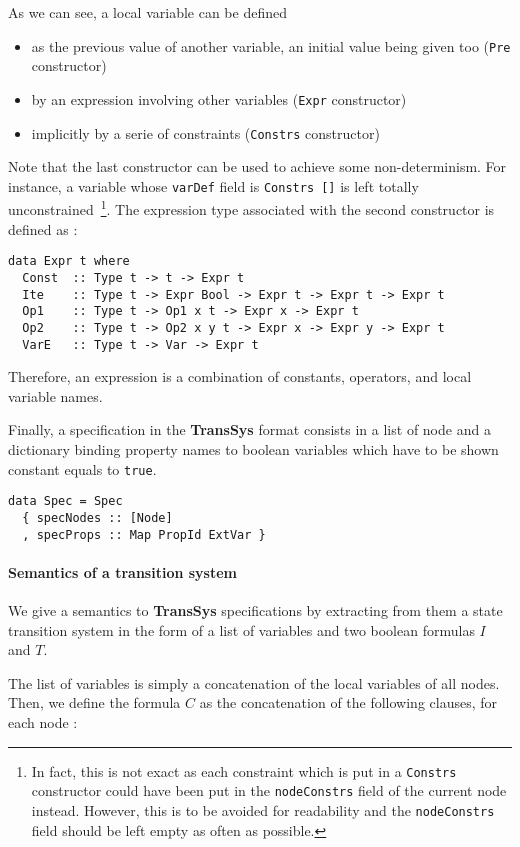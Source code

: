 As we can see, a local variable can be defined
\begin{itemize}
\item as the previous value of another variable, an initial value being given too (\texttt{Pre} constructor)
\item by an expression involving other variables (\texttt{Expr} constructor)
\item implicitly by a serie of constraints (\texttt{Constrs} constructor)
\end{itemize}
Note that the last constructor can be used to achieve some non-determinism. For instance, a variable whose \texttt{varDef} field is \texttt{Constrs []} is left totally unconstrained~\footnote{In fact, this is not exact as each constraint which is put in a \texttt{Constrs} constructor could have been put in the \texttt{nodeConstrs} field of the current node instead. However, this is to be avoided for readability and the \texttt{nodeConstrs} field should be left empty as often as possible.
}. The expression type associated with the second constructor is defined as :
\begin{lstlisting}[frame=single]
data Expr t where
  Const  :: Type t -> t -> Expr t
  Ite    :: Type t -> Expr Bool -> Expr t -> Expr t -> Expr t
  Op1    :: Type t -> Op1 x t -> Expr x -> Expr t
  Op2    :: Type t -> Op2 x y t -> Expr x -> Expr y -> Expr t
  VarE   :: Type t -> Var -> Expr t
\end{lstlisting}
Therefore, an expression is a combination of constants, operators, and local variable names.


Finally, a specification in the \textbf{TransSys} format consists in a list of node and a dictionary binding property names to boolean variables which have to be shown constant equals to \texttt{true}.
\begin{lstlisting}[frame=single]
data Spec = Spec
  { specNodes :: [Node]
  , specProps :: Map PropId ExtVar }
\end{lstlisting}


\paragraph{Semantics of a transition system}
We give a semantics to \textbf{TransSys} specifications by extracting from them a state transition system in the form of a list of variables and two boolean formulas $I$ and $T$. 

The list of variables is simply a concatenation of the local variables of all nodes. Then, we define the formula $C$ as the concatenation of the following clauses, for each node :


